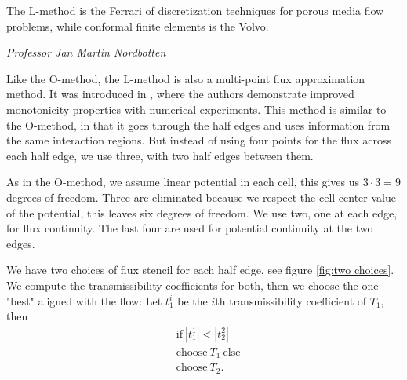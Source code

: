 \documentclass[../Main/main.tex]{subfiles}
\begin{document}
	\epigraph{The L-method is the Ferrari of discretization techniques for porous media flow problems, while conformal finite elements is the Volvo.}{\textit{Professor Jan Martin Nordbotten}}
	Like the O-method, the L-method is also a multi-point flux approximation method. It was introduced in \cite{https://doi.org/10.1002/num.20320}, where the authors demonstrate improved monotonicity properties with numerical experiments. This method is similar to the O-method, in that it goes through the half edges and uses information from the same interaction regions. But instead of using four points for the flux across each half edge, we use three, with two half edges between them. \par
	As in the O-method, we assume linear potential in each cell, this gives us $3\cdot 3 = 9$ degrees of freedom. Three are eliminated because we respect the cell center value of the potential, this leaves six degrees of freedom. We use two, one at each edge, for flux continuity. The last four are used for potential continuity at the two edges. 
	\par
	We have two choices of flux stencil for each half edge, see figure \ref{fig:two choices}. We compute the transmissibility coefficients for both, then we choose the one "best" aligned with the flow: Let $t_1^i$ be the $i$th transmissibility coefficient of $T_1$, then
	\begin{equation}\label{eq:L-criterion}
		\begin{aligned}
			&\text{if} \ |t^1_1| < |t^2_2| \\
			&\text{choose} \ T_1 \ \text{else} \\
			&\text{choose} \ T_2.
		\end{aligned}
	\end{equation}
\end{document}
